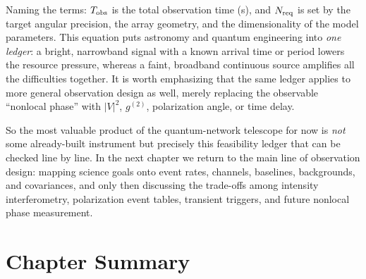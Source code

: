 Naming the terms: \(T_{\rm obs}\) is the total observation time (s), and \(N_{\rm req}\) is set by the target angular precision, the array geometry, and the dimensionality of the model parameters. This equation puts astronomy and quantum engineering into \emph{one ledger}: a bright, narrowband signal with a known arrival time or period lowers the resource pressure, whereas a faint, broadband continuous source amplifies all the difficulties together. It is worth emphasizing that the same ledger applies to more general observation design as well, merely replacing the observable ``nonlocal phase'' with \(|V|^2\), \(g^{(2)}\), polarization angle, or time delay.

So the most valuable product of the quantum-network telescope for now is \emph{not} some already-built instrument but precisely this feasibility ledger that can be checked line by line. In the next chapter we return to the main line of observation design: mapping science goals onto event rates, channels, baselines, backgrounds, and covariances, and only then discussing the trade-offs among intensity interferometry, polarization event tables, transient triggers, and future nonlocal phase measurement.

\section*{Chapter Summary}

